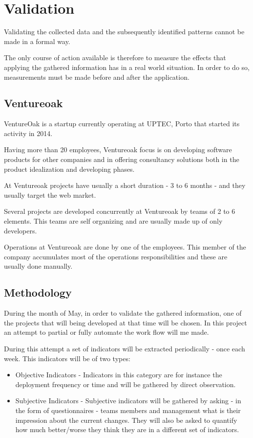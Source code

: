 \chapter{ Validation } \label{chap:validation}
	Validating the collected data and the subsequently identified patterns cannot be made in a formal way.

	The only course of action available is therefore to measure the effects that applying the gathered information has in a real world situation. In order to do so, measurements must be made before and after the application.

	\section{Ventureoak}

	VentureOak is a startup currently operating at UPTEC, Porto that started its activity in 2014. 

	Having more than 20 employees, Ventureoak focus is on developing software products for other companies and in offering consultancy solutions both in the product idealization and developing phases.  

	At Ventureoak projects have usually a short duration - 3 to 6 months - and they usually target the web market.

	Several projects are developed concurrently at Ventureoak by teams of 2 to 6 elements. This teams are self organizing and are usually made up of only developers. 

	Operations at Ventureoak are done by one of the employees. This member of the company accumulates most of the operations responsibilities and these are usually done manually. 

\section{Methodology} \label{chap:validation:sec:methodology}
	
	During the month of May, in order to validate the gathered information, one of the projects that will being developed at that time will be chosen. In this project an attempt to partial or fully automate the work flow will me made. 

	During this attempt a set of indicators will be extracted periodically - once each week. This indicators will be of two types:

	\begin{itemize}
		\item{Objective Indicators} - Indicators in this category are for instance the deployment frequency or time and will be gathered by direct observation.

		\item{Subjective Indicators} - Subjective indicators will be gathered by asking - in the form of 
questionnaires - teams members and management what is their impression about the current changes. They will also be asked to quantify how much better/worse they think they are in a different set of indicators.

	\end{itemize}

